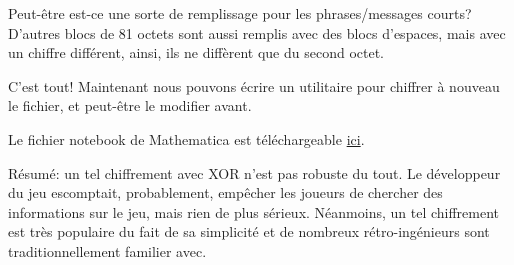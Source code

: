 Peut-être est-ce une sorte de remplissage pour les phrases/messages courts?
D'autres blocs de 81 octets sont aussi remplis avec des blocs d'espaces, mais avec
un chiffre différent, ainsi, ils ne diffèrent que du second octet.

C'est tout! Maintenant nous pouvons écrire un utilitaire pour chiffrer à nouveau le
fichier, et peut-être le modifier avant.

Le fichier notebook de Mathematica est téléchargeable 
\href{https://github.com/DennisYurichev/RE-for-beginners/blob/master/ff/XOR/mask_1/files/XOR_mask_1.nb}{ici}.

Résumé: un tel chiffrement avec XOR n'est pas robuste du tout. Le développeur du jeu
escomptait, probablement, empêcher les joueurs de chercher des informations sur le
jeu, mais rien de plus sérieux.
Néanmoins, un tel chiffrement est très populaire du fait de sa simplicité et de nombreux
rétro-ingénieurs sont traditionnellement familier avec.

